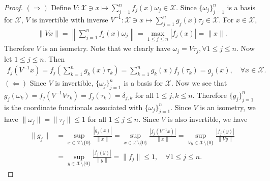 \documentclass{amsart}
\begin{document}
\begin{proof}
	$(\Rightarrow)$ Define $V:\mathcal{X}\ni x \mapsto \sum_{j=1}^{n}f_j(x)\omega_j \in \mathcal{X}$. Since $\{\omega_j\}_{j=1}^n$ is a basis for $\mathcal{X}$, $V$ is invertible with inverse $V^{-1}:\mathcal{X}\ni x \mapsto \sum_{j=1}^{n}g_j(x)\tau_j \in \mathcal{X}$. For $x \in \mathcal{X}$, 
	\begin{align*}
		\|Vx\|=\left\| \sum_{j=1}^{n}f_j(x)\omega_j \right\|=\max_{1\leq j\leq n}|f_j(x)|=\|x\|.
	\end{align*}
	Therefore $V$ is an  isometry. Note that we clearly have $\omega_j=V\tau_j,  \forall 1\leq j \leq n.$ Now let $1\leq j \leq n$. Then 
	\begin{align*}
		f_j(V^{-1}x)=f_j \left(\sum_{k=1}^{n}g_k(x)\tau_k \right)=\sum_{k=1}^{n}g_k(x)f_j(\tau_k)=g_j(x), \quad \forall x \in \mathcal{X}.
	\end{align*}
	$(\Leftarrow)$ Since $V$ is invertible, $\{\omega_j\}_{j=1}^n$ is a basis for $\mathcal{X}$. Now we see that $g_j(\omega_k)=f_j(V^{-1}V\tau_k)=f_j(\tau_k)=\delta_{j,k}$ for all $1\leq j, k \leq n$. Therefore $\{g_j\}_{j=1}^n$ is the coordinate functionals associated with $\{\omega_j\}_{j=1}^n$.  Since $V$ is an isometry, we have $\|\omega_j\|=\|\tau_j\|\leq 1$ for all $1\leq j \leq n$. Since $V$ is also  invertible, we have 
	\begin{align*}
		\|g_j\|&=\displaystyle\sup_{x\in \mathcal{X}\setminus \{0\}}\frac{|g_j(x)|}{\|x\|}=\displaystyle\sup_{x\in \mathcal{X}\setminus \{0\}}\frac{|f_j(V^{-1}x)|}{\|x\|}=\displaystyle\sup_{Vy \in \mathcal{X}\setminus \{0\}}\frac{|f_j(y)|}{\|Vy\|}\\
		&=\displaystyle\sup_{y \in \mathcal{X}\setminus \{0\}}\frac{|f_j(y)|}{\|y\|}=\|f_j\|\leq 1, \quad \forall 1\leq j \leq n.
	\end{align*}
\end{proof}
\end{document}
